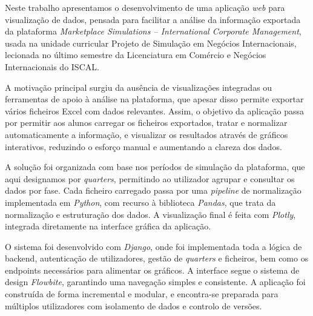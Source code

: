 




Neste trabalho apresentamos o desenvolvimento de uma aplicação \textit{web} para visualização de dados, pensada para facilitar a análise da informação exportada da plataforma \textit{Marketplace Simulations – International Corporate Management}, usada na unidade curricular Projeto de Simulação em Negócios Internacionais, lecionada no último semestre da Licenciatura em Comércio e Negócios Internacionais do ISCAL.

A motivação principal surgiu da ausência de visualizações integradas ou ferramentas de apoio à análise na plataforma, que apesar disso permite exportar vários ficheiros Excel com dados relevantes. Assim, o objetivo da aplicação passa por permitir aos alunos carregar os ficheiros exportados, tratar e normalizar automaticamente a informação, e visualizar os resultados através de gráficos interativos, reduzindo o esforço manual e aumentando a clareza dos dados.

A solução foi organizada com base nos períodos de simulação da plataforma, que aqui designamos por \textit{quarters}, permitindo ao utilizador agrupar e consultar os dados por fase. Cada ficheiro carregado passa por uma \textit{pipeline} de normalização implementada em \textit{Python}, com recurso à biblioteca \textit{Pandas}, que trata da normalização e estruturação dos dados. A visualização final é feita com \textit{Plotly}, integrada diretamente na interface gráfica da aplicação.

O sistema foi desenvolvido com \textit{Django}, onde foi implementada toda a lógica de backend, autenticação de utilizadores, gestão de \textit{quarters} e ficheiros, bem como os endpoints necessários para alimentar os gráficos. A interface segue o sistema de design \textit{Flowbite}, garantindo uma navegação simples e consistente. A aplicação foi construída de forma incremental e modular, e encontra-se preparada para múltiplos utilizadores com isolamento de dados e controlo de versões.

